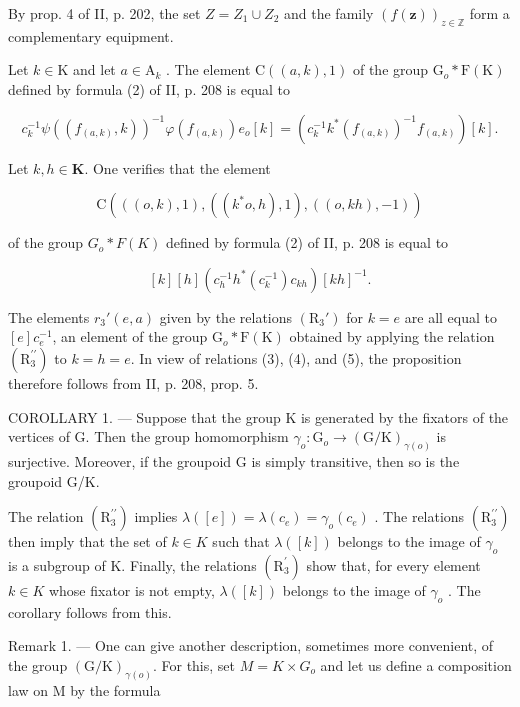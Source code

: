 By prop. 4 of II, p. 202, the set \(Z = Z_1 \cup Z_2\) and the family \((f(\mathbf{z}))_{z \in \mathbb{Z}}\) form a complementary equipment.

Let \(k \in \mathrm{K}\) and let \(a \in \mathrm{A}_k\) . The element \(\mathrm{C}((a, k), 1)\) of the group \(\mathrm{G}_o * \mathrm{F}(\mathrm{K})\) defined by formula (2) of II, p. 208 is equal to

\[
c _ {k} ^ {- 1} \psi ((f _ {(a, k)}, k)) ^ {- 1} \varphi (f _ {(a, k)}) e _ {o} [ k ] = (c _ {k} ^ {- 1} k ^ {*} (f _ {(a, k)}) ^ {- 1} f _ {(a, k)}) [ k ].\tag{4}
\]

Let \(k,h \in \mathbf{K}\). One verifies that the element

\[
\mathrm{C} (((o, k), 1), ((k ^ {*} o, h), 1), ((o, k h), - 1))
\]

of the group \(G_{o} * F(K)\) defined by formula (2) of II, p. 208 is equal to

\[
[ k ] [ h ] (c _ {h} ^ {- 1} h ^ {*} (c _ {k} ^ {- 1}) c _ {k h}) [ k h ] ^ {- 1}.\tag{5}
\]

The elements \(r_3'(e, a)\) given by the relations \((\mathrm{R}_3')\) for \(k = e\) are all equal to \([e]c_e^{-1}\), an element of the group \(\mathrm{G}_o * \mathrm{F}(\mathrm{K})\) obtained by applying the relation \((\mathrm{R}_{3}^{\prime\prime})\) to \(k = h = e\). In view of relations (3), (4), and (5), the proposition therefore follows from II, p. 208, prop. 5.

COROLLARY 1. --- Suppose that the group K is generated by the fixators of the vertices of G. Then the group homomorphism \(\gamma_{o}\colon\mathrm{G}_{o}\to(\mathrm{G}/\mathrm{K})_{\gamma(o)}\) is surjective. Moreover, if the groupoid G is simply transitive, then so is the groupoid G/K.

The relation \((\mathrm{R}_{3}^{\prime\prime})\) implies \(\lambda([e]) = \lambda(c_{e}) = \gamma_{o}(c_{e})\) . The relations \((\mathrm{R}_{3}^{\prime\prime})\) then imply that the set of \(k \in K\) such that \(\lambda([k])\) belongs to the image of \(\gamma_{o}\) is a subgroup of K. Finally, the relations \((\mathrm{R}_{3}^{\prime})\) show that, for every element \(k \in K\) whose fixator is not empty, \(\lambda([k])\) belongs to the image of \(\gamma_{o}\) . The corollary follows from this.

Remark 1. --- One can give another description, sometimes more convenient, of the group \((\mathrm{G}/\mathrm{K})_{\gamma(o)}\). For this, set \(M = K \times G_{o}\) and let us define a composition law on M by the formula

